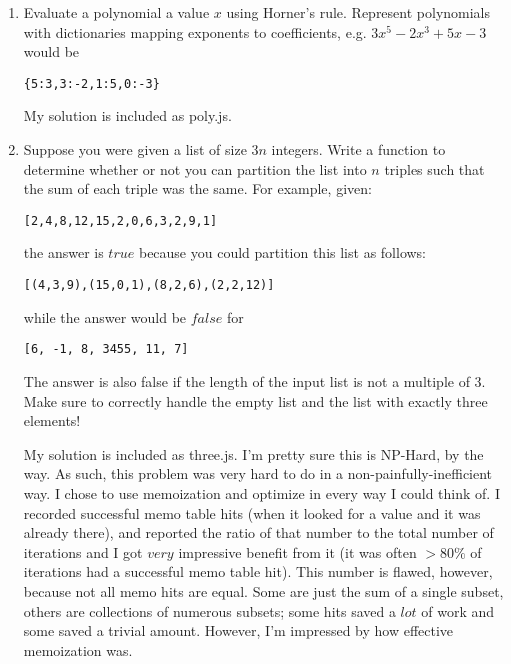 \documentclass[a4paper,12pt]{article}
\begin{document}
\begin{enumerate}
\item Evaluate a polynomial a value $x$ using Horner's rule. Represent polynomials with dictionaries mapping exponents to coefficients, e.g. $3x^5−2x^3+5x−3$ would be
\begin{verbatim}
{5:3,3:-2,1:5,0:-3}
\end{verbatim}

\vspace{5 mm}

My solution is included as poly.js.

\item Suppose you were given a list of size $3n$ integers. Write a function to determine whether or not you can partition the list into $n$ triples such that the sum of each triple was the same. For example, given:
\begin{verbatim}
[2,4,8,12,15,2,0,6,3,2,9,1]
\end{verbatim}

the answer is $true$ because you could partition this list as follows:

\begin{verbatim}
[(4,3,9),(15,0,1),(8,2,6),(2,2,12)]
\end{verbatim}

while the answer would be $false$ for 

\begin{verbatim}
[6, -1, 8, 3455, 11, 7]
\end{verbatim}

The answer is also false if the length of the input list is not a multiple of 3. Make sure to correctly handle the empty list and the list with exactly three elements!

\vspace{5 mm}

My solution is included as three.js. I'm pretty sure this is NP-Hard, by the way. As such, this problem was very hard to do in a non-painfully-inefficient way. I chose to use memoization and optimize in every way I could think of. I recorded successful memo table hits (when it looked for a value and it was already there), and reported the ratio of that number to the total number of iterations and I got $very$ impressive benefit from it (it was often $> 80\%$ of iterations had a successful memo table hit). This number is flawed, however, because not all memo hits are equal. Some are just the sum of a single subset, others are collections of numerous subsets; some hits saved a $lot$ of work and some saved a trivial amount. However, I'm impressed by how effective memoization was.



\end{enumerate}
\end{document}
